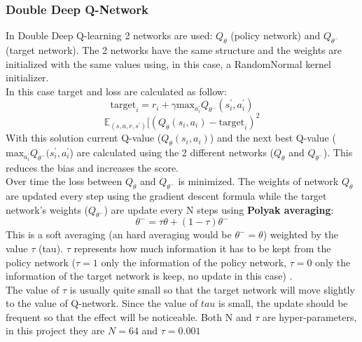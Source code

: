 \documentclass[14pt]{extarticle}
\def\sp{\vspace{5pt}}
\def\pp{\vspace{10pt}\newline}
\begin{document}
\begin{flushleft}
	\subsubsection{Double Deep Q-Network} \label{DDQN}
	\sp
	In Double Deep Q-learning 2 networks are used: $Q_{\theta}$ (policy network) and $Q_{\theta^{-}}$ (target network). The 2 networks have the same structure and the weights are initialized with the same values using, in this case, a RandomNormal kernel initializer. \\
	In this case target and loss are calculated as follow:
	\[
\text{target}_i = r_i + \gamma\text{max}_{a_i^\prime}Q_{\theta^{-}}(s_i^{\prime},a_i^{\prime})
\]
\[\mathbb{E}_{(s,a,r,s^\prime)}[(Q_{\theta}(s_i,a_i) - \text{target}_i)^2\] 
With this solution current Q-value ($Q_{\theta}(s_i,a_i)$) and the next best Q-value ($\text{max}_{a_i^\prime}Q_{\theta^{-}}(s_i^{\prime},a_i^{\prime}$) are calculated using the 2 different networks ($Q_{\theta}$ and $Q_{\theta^{-}}$). This reduces the bias and increases the score.
\\
Over time the loss between $Q_{\theta}$ and $Q_{\theta^{-}}$ is minimized. The weights of network $Q_{\theta}$ are updated every step using the gradient descent formula while the target network's weights ($Q_{\theta^{-}}$) are update every N steps using \textbf{Polyak averaging}: 
\begin{equation} \label{eq:updateweights}
 \theta^{-} = \tau\theta + (1-\tau)\theta^{-} 
 \end{equation}
This is a soft averaging (an hard averaging would be $\theta^{-}=\theta$) weighted by the value $\tau$ (tau). $\tau$ represents how much information it has to be kept from the policy network ($\tau=1$ only the information of the policy network, $\tau=0$ only the information of the target network is keep, no update in this case) \cite{DDQN1,DDQN2}. \\
The value of $\tau$ is usually quite small so that the target network will move slightly to the value of Q-network. Since the value of $tau$ is small, the update should be frequent so that the effect will be noticeable.
\pp
Both N and $\tau$ are hyper-parameters, in this project they are $N=64$ and $\tau=0.001$
\begin{figure}[H]
\begin{center}
	\begin{tikzpicture}[x=25mm, y=0.09\textwidth, >=stealth]
	

\end{tikzpicture}
\end{center}
\end{figure}
\end{flushleft}
\end{document}
